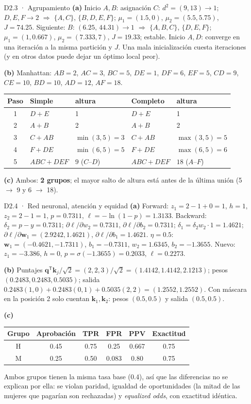 \begin{solucion}{D2.3 · Agrupamiento}
\textbf{(a)} Inicio $A,B$: asignación $C$: $d^2=(9,13)\to1$; $D,E,F\to2$ $\Rightarrow$ $\{A,C\}$, $\{B,D,E,F\}$; $\mu_1=(1.5,0)$, $\mu_2=(5.5,5.75)$, $J=74.25$.
Siguiente: $B$: $(6.25,\,44.31)\to1$ $\Rightarrow$ $\{A,B,C\}$, $\{D,E,F\}$; $\mu_1=(1,0.667)$, $\mu_2=(7.333,7)$, $J=\mathbf{19.33}$; estable.
Inicio $A,D$: converge en una iteración a la misma partición y $J$. Una mala inicialización cuesta iteraciones (y en otros datos puede dejar un óptimo local peor).

\textbf{(b)} Manhattan: $AB=2$, $AC=3$, $BC=5$, $DE=1$, $DF=6$, $EF=5$, $CD=9$, $CE=10$, $BD=10$, $AD=12$, $AF=18$.
\begin{center}\small
\begin{tabular}{c|ll|ll}
Paso & Simple & altura & Completo & altura\\\hline
1 & $D+E$ & 1 & $D+E$ & 1\\
2 & $A+B$ & 2 & $A+B$ & 2\\
3 & $C+AB$ & $\min(3,5)=3$ & $C+AB$ & $\max(3,5)=5$\\
4 & $F+DE$ & $\min(6,5)=5$ & $F+DE$ & $\max(6,5)=6$\\
5 & $ABC+DEF$ & $9$ ($C$–$D$) & $ABC+DEF$ & $18$ ($A$–$F$)
\end{tabular}
\end{center}
\textbf{(c)} Ambos: \textbf{2 grupos}; el mayor salto de altura está antes de la última unión (5 $\to$ 9 y 6 $\to$ 18).
\end{solucion}

\begin{solucion}{D2.4 · Red neuronal, atención y equidad}
\textbf{(a)} Forward: $z_1=2-1+0=1$, $h=1$, $z_2=2-1=1$, $p=0.7311$, $\ell=-\ln(1-p)=\mathbf{1.3133}$.
Backward: $\delta_2=p-y=0.7311$; $\partial\ell/\partial w_2=0.7311$, $\partial\ell/\partial b_2=0.7311$; $\delta_1=\delta_2w_2\cdot1=1.4621$;
$\partial\ell/\partial\mathbf w_1=(2.9242,1.4621)$, $\partial\ell/\partial b_1=1.4621$.
$\eta=0.5$: $\mathbf w_1=(-0.4621,-1.7311)$, $b_1=-0.7311$, $w_2=1.6345$, $b_2=-1.3655$.
Nuevo: $z_1=-3.386$, $h=0$, $p=\sigma(-1.3655)=0.2033$, $\ell=\mathbf{0.2273}$.

\textbf{(b)} Puntajes $\mathbf q^\mathsf T\mathbf k_j/\sqrt2=(2,2,3)/\sqrt2=(1.4142,1.4142,2.1213)$; pesos $(0.2483,0.2483,0.5035)$;
salida $0.2483(1,0)+0.2483(0,1)+0.5035(2,2)=(\mathbf{1.2552},\mathbf{1.2552})$. Con máscara en la posición 2 solo cuentan $\mathbf k_1,\mathbf k_2$:
pesos $(0.5,0.5)$ y salida $(0.5,0.5)$.

\textbf{(c)}
\begin{center}\small
\begin{tabular}{c|ccccc}
Grupo & Aprobación & TPR & FPR & PPV & Exactitud\\\hline
H & 0.45 & 0.75 & 0.25 & 0.667 & 0.75\\
M & 0.25 & 0.50 & 0.083 & 0.80 & 0.75
\end{tabular}
\end{center}
Ambos grupos tienen la misma tasa base (0.4), así que las diferencias no se explican por ella: se violan paridad, igualdad de oportunidades
(la mitad de las mujeres que pagarían son rechazadas) y \emph{equalized odds}, con exactitud idéntica.
\end{solucion}
